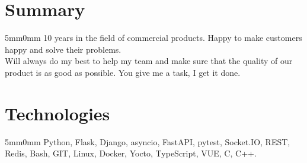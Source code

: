 \documentclass[10pt]{article}
\newcommand{\lmvalue}{5mm}
\newcommand{\rmvalue}{0mm}
\begin{document}

\section*{Summary}
\begin{changemargin}{\lmvalue}{\rmvalue}
	10 years in the field of commercial products.
	Happy to make customers happy and solve their problems.\\
	Will always do my best to help my team and make sure that the quality of our product is as good as possible.
	You give me a task, I get it done.
\end{changemargin}
\section*{Technologies}
\begin{changemargin}{\lmvalue}{\rmvalue}
	Python, Flask, Django, asyncio, FastAPI, pytest, Socket.IO, REST, Redis, Bash, GIT, Linux,
	Docker, Yocto, TypeScript, VUE, C, C++.
\end{changemargin}
\end{document}
